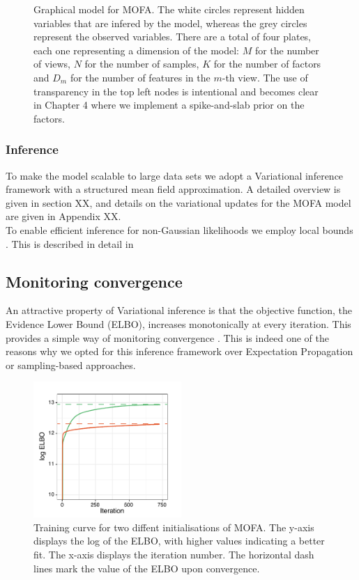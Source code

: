 \begin{figure}[H]
	\centering
	
	\caption{Graphical model for MOFA. The white circles represent hidden variables that are infered by the model, whereas the grey circles represent the observed variables. There are a total of four plates, each one representing a dimension of the model: $M$ for the number of views, $N$ for the number of samples, $K$ for the number of factors and $D_m$ for the number of features in the $m$-th view. The use of transparency in the top left nodes is intentional and becomes clear in Chapter 4 where we implement a spike-and-slab prior on the factors.}
	\label{fig:MOFA_graphical_model}
\end{figure}

\subsubsection{Inference}
To make the model scalable to large data sets we adopt a Variational inference framework with a structured mean field approximation. 
A detailed overview is given in section XX, and details on the variational updates for the MOFA model are given in Appendix XX.\\
To enable efficient inference for non-Gaussian likelihoods we employ local bounds \cite{Jaakkola2000,Seeger2012}. This is described in detail in 

\subsection{Monitoring convergence}
An attractive property of Variational inference is that the objective function, the Evidence Lower Bound (ELBO), increases monotonically at every iteration. This provides a simple way of monitoring convergence . This is indeed one of the reasons why we opted for this inference framework over Expectation Propagation or sampling-based approaches.

 \begin{figure}[H]
	\centering 	
	\includegraphics[width=0.5\textwidth]{elbo_convergence}
	\caption{Training curve for two diffent initialisations of MOFA. The y-axis displays the log of the ELBO, with higher values indicating a better fit. The x-axis displays the iteration number. The horizontal dash lines mark the value of the ELBO upon convergence. }
	\label{fig:elbo_convergence}
\end{figure}

